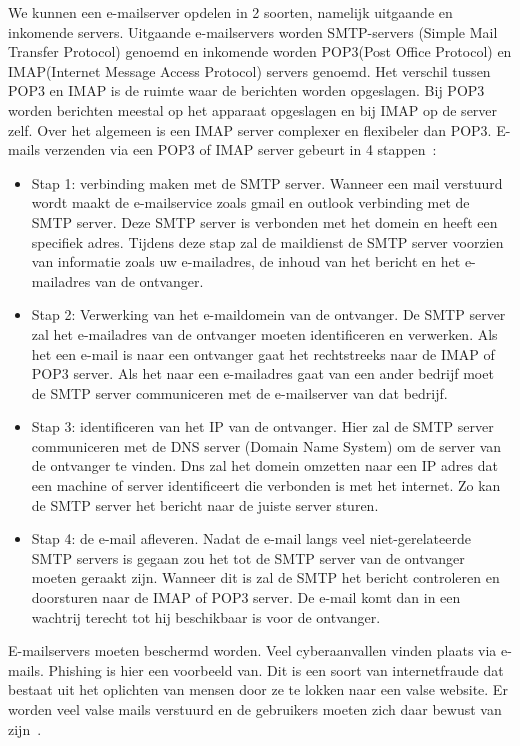 We kunnen een e-mailserver opdelen in 2 soorten, namelijk uitgaande en inkomende servers. Uitgaande e-mailservers worden SMTP-servers (Simple Mail Transfer Protocol) genoemd en inkomende worden POP3(Post Office Protocol) en IMAP(Internet Message Access Protocol) servers genoemd. Het verschil tussen POP3 en IMAP is de ruimte waar de berichten worden opgeslagen. Bij POP3 worden berichten meestal op het apparaat opgeslagen en bij IMAP op de server zelf. Over het algemeen is een IMAP server complexer en flexibeler dan POP3. E-mails verzenden via een POP3 of IMAP server gebeurt in 4 stappen~\autocite{Gatefy2021}:
\begin{itemize}
    \item Stap 1: verbinding maken met de SMTP server. Wanneer een mail verstuurd wordt maakt de e-mailservice zoals gmail en outlook verbinding met de SMTP server. Deze SMTP server is verbonden met het domein en heeft een specifiek adres. Tijdens deze stap zal de maildienst de SMTP server voorzien van informatie zoals uw e-mailadres, de inhoud van het bericht en het e-mailadres van de ontvanger.
    \item Stap 2: Verwerking van het e-maildomein van de ontvanger. De SMTP server zal het e-mailadres van de ontvanger moeten identificeren en verwerken. Als het een e-mail is naar een ontvanger gaat het rechtstreeks naar de IMAP of POP3 server. Als het naar een e-mailadres gaat van een ander bedrijf moet de SMTP server communiceren met de e-mailserver van dat bedrijf. 
    \item Stap 3: identificeren van het IP van de ontvanger. Hier zal de SMTP server communiceren met de DNS server (Domain Name System) om de server van de ontvanger te vinden. Dns zal het domein omzetten naar een IP adres dat een machine of server identificeert die verbonden is met het internet. Zo kan de SMTP server het bericht naar de juiste server sturen.
    \item Stap 4: de e-mail afleveren. Nadat de e-mail langs veel niet-gerelateerde SMTP servers is gegaan zou het tot de SMTP server van de ontvanger moeten geraakt zijn. Wanneer dit is zal de SMTP het bericht controleren en doorsturen naar de IMAP of POP3 server. De e-mail komt dan in een wachtrij terecht tot  hij beschikbaar is voor de ontvanger. 
\end{itemize}

E-mailservers moeten beschermd worden. Veel cyberaanvallen vinden plaats via e-mails. Phishing is hier een voorbeeld van. Dit is een soort van internetfraude dat bestaat uit het oplichten van mensen door ze te lokken naar een valse website. Er worden veel valse mails verstuurd en de gebruikers moeten zich daar bewust van zijn~\autocite{Gatefy2021}.
 
